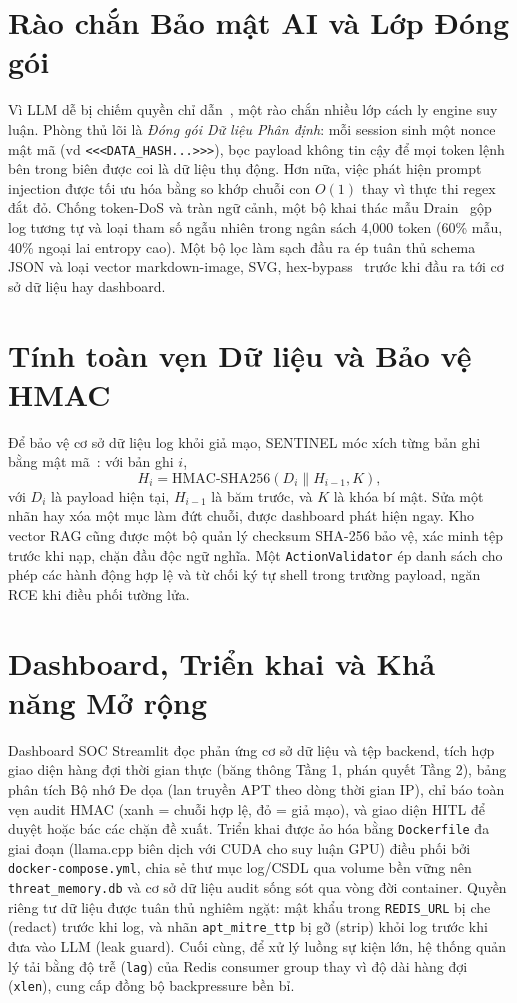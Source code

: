 \section{Rào chắn Bảo mật AI và Lớp Đóng gói}
Vì LLM dễ bị chiếm quyền chỉ dẫn~\cite{promptinjection2023}, một rào chắn nhiều lớp cách ly engine suy luận. Phòng thủ lõi là \emph{Đóng gói Dữ liệu Phân định}: mỗi session sinh một nonce mật mã (vd \texttt{<<<DATA\_HASH...>>>}), bọc payload không tin cậy để mọi token lệnh bên trong biên được coi là dữ liệu thụ động. Hơn nữa, việc phát hiện prompt injection được tối ưu hóa bằng so khớp chuỗi con $O(1)$ thay vì thực thi regex đắt đỏ. Chống token-DoS và tràn ngữ cảnh, một bộ khai thác mẫu Drain~\cite{he2017drain} gộp log tương tự và loại tham số ngẫu nhiên trong ngân sách 4{,}000 token (60\% mẫu, 40\% ngoại lai entropy cao). Một bộ lọc làm sạch đầu ra ép tuân thủ schema JSON và loại vector markdown-image, SVG, hex-bypass~\cite{owasp_llm2025} trước khi đầu ra tới cơ sở dữ liệu hay dashboard.

\section{Tính toàn vẹn Dữ liệu và Bảo vệ HMAC}
Để bảo vệ cơ sở dữ liệu log khỏi giả mạo, SENTINEL móc xích từng bản ghi bằng mật mã~\cite{hmac1997}: với bản ghi $i$,
\begin{equation}
    H_i = \text{HMAC-SHA256}(D_i \parallel H_{i-1}, K),
\end{equation}
với $D_i$ là payload hiện tại, $H_{i-1}$ là băm trước, và $K$ là khóa bí mật. Sửa một nhãn hay xóa một mục làm đứt chuỗi, được dashboard phát hiện ngay. Kho vector RAG cũng được một bộ quản lý checksum SHA-256 bảo vệ, xác minh tệp trước khi nạp, chặn đầu độc ngữ nghĩa. Một \texttt{ActionValidator} ép danh sách cho phép các hành động hợp lệ và từ chối ký tự shell trong trường payload, ngăn RCE khi điều phối tường lửa.

\section{Dashboard, Triển khai và Khả năng Mở rộng}
Dashboard SOC Streamlit đọc phản ứng cơ sở dữ liệu và tệp backend, tích hợp giao diện hàng đợi thời gian thực (băng thông Tầng 1, phán quyết Tầng 2), bảng phân tích Bộ nhớ Đe dọa (lan truyền APT theo dòng thời gian IP), chỉ báo toàn vẹn audit HMAC (xanh = chuỗi hợp lệ, đỏ = giả mạo), và giao diện HITL để duyệt hoặc bác các chặn đề xuất. Triển khai được ảo hóa bằng \texttt{Dockerfile} đa giai đoạn (llama.cpp biên dịch với CUDA cho suy luận GPU) điều phối bởi \texttt{docker-compose.yml}, chia sẻ thư mục log/CSDL qua volume bền vững nên \texttt{threat\_memory.db} và cơ sở dữ liệu audit sống sót qua vòng đời container. Quyền riêng tư dữ liệu được tuân thủ nghiêm ngặt: mật khẩu trong \texttt{REDIS\_URL} bị che (redact) trước khi log, và nhãn \texttt{apt\_mitre\_ttp} bị gỡ (strip) khỏi log trước khi đưa vào LLM (leak guard). Cuối cùng, để xử lý luồng sự kiện lớn, hệ thống quản lý tải bằng độ trễ (\texttt{lag}) của Redis consumer group thay vì độ dài hàng đợi (\texttt{xlen}), cung cấp đồng bộ backpressure bền bỉ.

